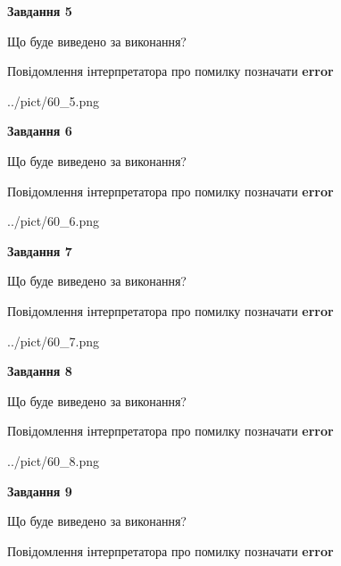 \documentclass[11pt, ukrainian]{article}
\begin{document}
{\begin {large}
{\begin {center}\textbf{Завдання 5}\end {center}}\par
Що буде виведено за виконання? \par
Повідомлення інтерпретатора про помилку позначати \textbf{error}

\begin{center}
	{../pict/60_5.png}
\end{center}
\newpage

{\begin {center}\textbf{Завдання 6}\end {center}}\par
Що буде виведено за виконання? \par
Повідомлення інтерпретатора про помилку позначати \textbf{error}

\begin{center}
	{../pict/60_6.png}
\end{center}
\newpage

{\begin {center}\textbf{Завдання 7}\end {center}}\par
Що буде виведено за виконання? \par
Повідомлення інтерпретатора про помилку позначати \textbf{error}

\begin{center}
	{../pict/60_7.png}
\end{center}
\newpage

{\begin {center}\textbf{Завдання 8}\end {center}}\par
Що буде виведено за виконання? \par
Повідомлення інтерпретатора про помилку позначати \textbf{error}

\begin{center}
	{../pict/60_8.png}
\end{center}
\newpage

{\begin {center}\textbf{Завдання 9}\end {center}}\par
Що буде виведено за виконання? \par
Повідомлення інтерпретатора про помилку позначати \textbf{error}


\end{large}}
\end{document}
